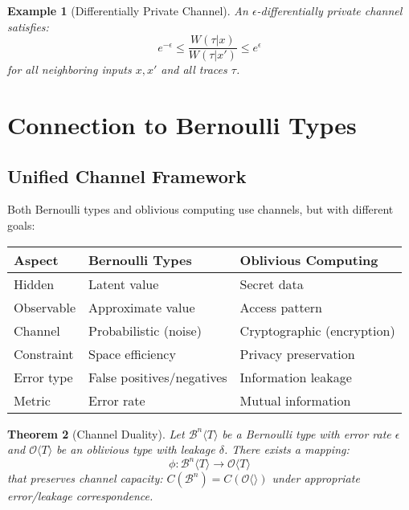 \documentclass[11pt,final,hidelinks]{article}
\newtheorem{theorem}{Theorem}[section]
\newtheorem{example}[theorem]{Example}
\newcommand{\Oblivious}[1]{\mathcal{O}\langle #1 \rangle}
\begin{document}
\begin{example}[Differentially Private Channel]
An $\epsilon$-differentially private channel satisfies:
\begin{equation}
e^{-\epsilon} \leq \frac{W(\tau|x)}{W(\tau|x')} \leq e^{\epsilon}
\end{equation}
for all neighboring inputs $x, x'$ and all traces $\tau$.
\end{example}

\section{Connection to Bernoulli Types}

\subsection{Unified Channel Framework}

Both Bernoulli types and oblivious computing use channels, but with different goals:

\begin{center}
\begin{tabular}{lll}
\textbf{Aspect} & \textbf{Bernoulli Types} & \textbf{Oblivious Computing} \\
\hline
Hidden & Latent value & Secret data \\
Observable & Approximate value & Access pattern \\
Channel & Probabilistic (noise) & Cryptographic (encryption) \\
Constraint & Space efficiency & Privacy preservation \\
Error type & False positives/negatives & Information leakage \\
Metric & Error rate & Mutual information \\
\end{tabular}
\end{center}

\begin{theorem}[Channel Duality]
Let $\mathcal{B}^n\langle T \rangle$ be a Bernoulli type with error rate $\epsilon$ and $\Oblivious{T}$ be an oblivious type with leakage $\delta$. There exists a mapping:
\begin{equation}
\phi: \mathcal{B}^n\langle T \rangle \to \Oblivious{T}
\end{equation}
that preserves channel capacity: $C(\mathcal{B}^n) = C(\Oblivious{})$ under appropriate error/leakage correspondence.
\end{theorem}
\end{document}
